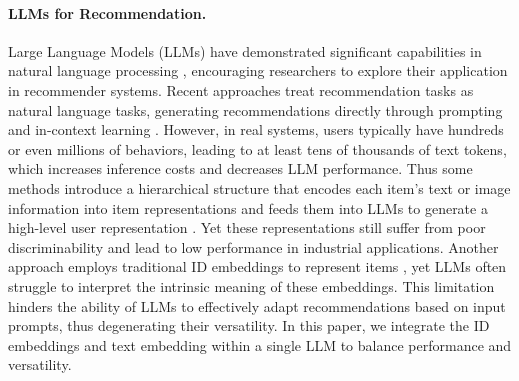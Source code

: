\paragraph{LLMs for Recommendation.}
Large Language Models (LLMs)  have demonstrated significant capabilities in natural language processing \cite{cite:GPT,cite:GPT2, GPT3, gpt4}, encouraging researchers to explore their application in recommender systems.
Recent approaches  treat  recommendation tasks as natural language tasks, generating recommendations directly through prompting and in-context learning \cite{P5, cite:Uncovering_ChatGPT,IsGPTGood,InstructionFollowing,ilora}. 
However, in real systems, users typically have hundreds or even millions of behaviors, leading to at least tens of thousands of text tokens, which increases inference costs and decreases LLM performance.
Thus some methods introduce a hierarchical structure that encodes each item's text or image information into item representations and feeds them into LLMs to generate a high-level user representation \cite{HLLM,Jia2024KnowledgeAF,ye2024harnessing}. Yet these representations still suffer from poor discriminability and lead to low performance in industrial applications. 
Another approach employs traditional ID embeddings to represent items \cite{CoLLM,E4SRec,LlaRA}, yet LLMs often struggle to interpret the intrinsic meaning of these embeddings. 
This limitation hinders the ability of LLMs to effectively adapt recommendations based on input prompts, thus degenerating their versatility. 
In this paper,  we integrate the ID embeddings and text embedding 
within a single LLM to balance performance and versatility.